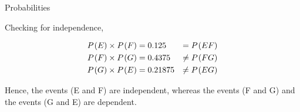 \documentclass[journal,12pt,twocolumn]{IEEEtran}
\begin{document}
	\begin{table}[h!]
	
		\caption{Probabilities}
		
		
		
			\label{table2}
	
	\end{table}


	Checking for independence,
	
	\begin{align}
		P_{}\left(E\right) \times P_{}\left(F\right) &= 0.125 &= P_{}\left(EF\right)\\
		P_{}\left(F\right) \times P_{}\left(G\right) &= 0.4375 &\neq P_{}\left(FG\right)\\
		P_{}\left(G\right) \times P_{}\left(E\right) &= 0.21875 &\neq P_{}\left(EG\right)
	\end{align}
	
	Hence, the events (E and F) are independent, whereas the events (F and G) and the events (G and E) are dependent.
				
\end{document}
